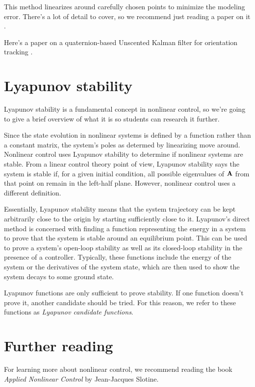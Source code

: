 This method linearizes around carefully chosen points to minimize the modeling
error. There's a lot of detail to cover, so we recommend just reading a paper on
it \cite{bib:unscented-kalman-filter}.

Here's a paper on a quaternion-based Unscented Kalman filter for orientation
tracking \cite{bib:ukf-state-tracking}.

\section{Lyapunov stability}

Lyapunov stability is a fundamental concept in nonlinear control, so we're going
to give a brief overview of what it is so students can research it further.

Since the state evolution in nonlinear systems is defined by a function rather
than a constant matrix, the system's poles as determed by linearizing move
around. Nonlinear control uses Lyapunov stability to determine if nonlinear
systems are stable. From a linear control theory point of view, Lyapunov
stability says the system is stable if, for a given initial condition, all
possible eigenvalues of $\mathbf{A}$ from that point on remain in the left-half
plane. However, nonlinear control uses a different definition.

Essentially, Lyapunov stability means that the system trajectory can be kept
arbitrarily close to the origin by starting sufficiently close to it. Lyapunov's
direct method is concerned with finding a function representing the energy in a
system to prove that the system is stable around an equilibrium point. This can
be used to prove a system's open-loop stability as well as its closed-loop
stability in the presence of a controller. Typically, these functions include
the energy of the system or the derivatives of the system state, which are then
used to show the system decays to some ground state.

Lyapunov functions are only sufficient to prove stability. If one function
doesn't prove it, another candidate should be tried. For this reason, we refer
to these functions as \textit{Lyapunov candidate functions}.

\section{Further reading}

For learning more about nonlinear control, we recommend reading the book
\textit{Applied Nonlinear Control} by Jean-Jacques Slotine.
